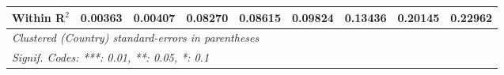 \begin{table}[htbp]
\begin{tabular}{lcccccccc}
      Within R$^2$                                            & 0.00363  & 0.00407  & 0.08270  & 0.08615  & 0.09824  & 0.13436  & 0.20145        & 0.22962\\  
      \midrule \midrule
      \multicolumn{9}{l}{\emph{Clustered (Country) standard-errors in parentheses}}\\
      \multicolumn{9}{l}{\emph{Signif. Codes: ***: 0.01, **: 0.05, *: 0.1}}\\
   \end{tabular}
\end{table}


